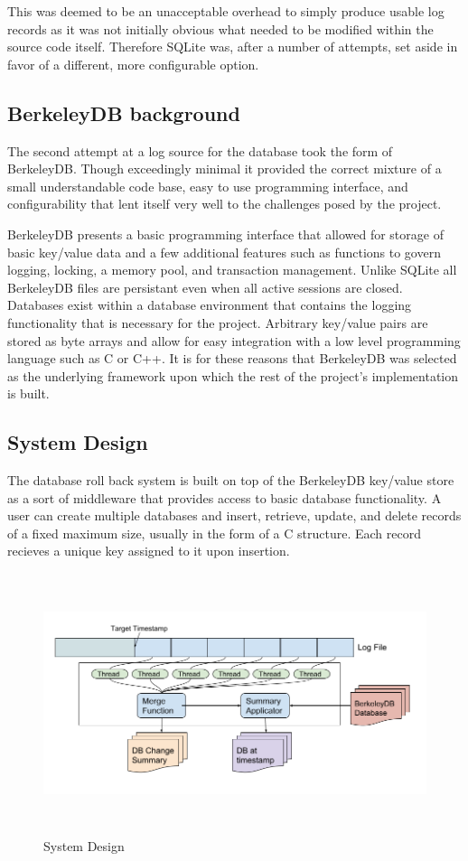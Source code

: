 \documentclass{article}
\begin{document}
This was deemed to be an unacceptable overhead to simply produce usable log records as it was not initially obvious what needed to be modified within the source code itself. Therefore SQLite was, after a number of attempts, set aside in favor of a different, more configurable option.

\subsection{BerkeleyDB background}
The second attempt at a log source for the database took the form of BerkeleyDB. Though exceedingly minimal it provided the correct mixture of a small understandable code base, easy to use programming interface, and configurability that lent itself very well to the challenges posed by the project.

BerkeleyDB presents a basic programming interface that allowed for storage of basic key/value data and a few additional features such as functions to govern logging, locking, a memory pool, and transaction management. Unlike SQLite all BerkeleyDB files are persistant even when all active sessions are closed. Databases exist within a database environment that contains the logging functionality that is necessary for the project. Arbitrary key/value pairs are stored as byte arrays and allow for easy integration with a low level programming language such as C or C++. It is for these reasons that BerkeleyDB was selected as the underlying framework upon which the rest of the project's implementation is built.

\subsection{System Design}
The database roll back system is built on top of the BerkeleyDB key/value store as a sort of middleware that provides access to basic database functionality. A user can create multiple databases and insert, retrieve, update, and delete records of a fixed maximum size, usually in the form of a C structure. Each record recieves a unique key assigned to it upon insertion. 

\begin{figure}
    \centering
    \includegraphics[height=3in]{rollbackDesgin.png}
    \caption{System Design}
    \label{fig:design1}
\end{figure}
\end{document}
